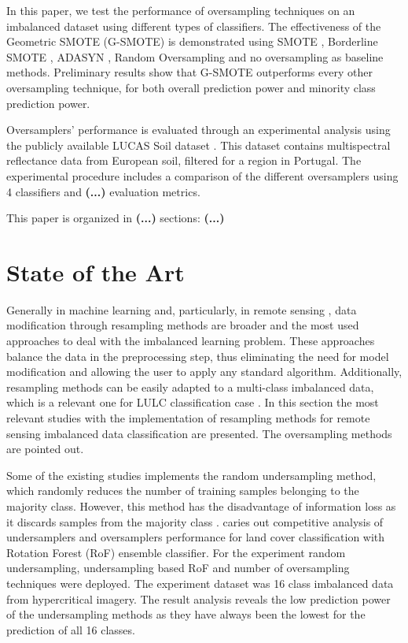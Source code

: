 \documentclass[parskip=full]{scrartcl}
\begin{document}
In this paper, we test the performance of oversampling techniques on an
imbalanced dataset using different types of classifiers. The effectiveness of
the Geometric SMOTE (G-SMOTE) \cite{Douzas2019} is demonstrated using SMOTE
\cite{Chawla2002}, Borderline SMOTE \cite{Han2005}, ADASYN \cite{HaiboHe2008},
Random Oversampling and no oversampling as baseline methods. Preliminary results
show that G-SMOTE outperforms every other oversampling technique, for both
overall prediction power and minority class prediction power.

Oversamplers' performance is evaluated through an experimental analysis using
the publicly available LUCAS Soil dataset \cite{Toth2013}. This dataset contains
multispectral reflectance data from European soil, filtered for a region in
Portugal. The experimental procedure includes a comparison of the different
oversamplers using 4 classifiers and \textbf{(...)} evaluation metrics.

This paper is organized in \textbf{(...)} sections: \textbf{(...)}

\section{State of the Art}

Generally in machine learning \cite{Douzas2019} and, particularly, in
remote sensing \cite{Feng2019}, data modification through resampling methods
are broader and the most used approaches to deal with the imbalanced learning
problem. These approaches balance the data in the preprocessing step, thus
eliminating the need for model modification and allowing the user to apply any
standard algorithm. Additionally, resampling methods can be easily adapted to a
multi-class imbalanced data, which is a relevant one for LULC classification
case \cite{Feng2019}. In this section the most relevant studies with the
implementation of resampling methods for remote sensing imbalanced data
classification are presented. The oversampling methods are pointed out.

Some of the existing studies implements the random undersampling method,
which randomly reduces the number of training samples  belonging to the
majority class. However, this method has the disadvantage of information loss
as it discards samples from the majority class  \cite{Feng2019}.
\cite{Feng2018} caries out competitive analysis of  undersamplers and
oversamplers performance for land cover classification with  Rotation Forest
(RoF) ensemble classifier. For the experiment random  undersampling,
undersampling based RoF and number of oversampling techniques  were deployed.
The experiment dataset was 16 class imbalanced data from  hypercritical
imagery. The result analysis reveals the low prediction power of the
undersampling methods as they have always been the lowest for the prediction of
all 16 classes.
\end{document}
